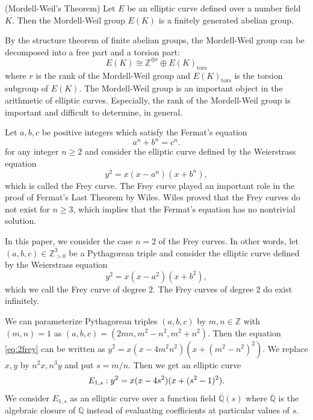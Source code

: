\documentclass[main]{subfiles}
\begin{document}
\begin{thm}{(Mordell-Weil's Theorem)}
    \label{thm:mordell}
    Let $E$ be an elliptic curve defined over a number field $K$.
    Then the Mordell-Weil group $E(K)$ is a finitely generated abelian group.
\end{thm}
By the structure theorem of finite abelian groups, the Mordell-Weil group can be decomposed into a free part and a torsion part:
\begin{equation*}
    E(K) \cong \mathbb{Z}^{\oplus r} \oplus E(K)_{\text{tors}}
\end{equation*}
where $r$ is the rank of the Mordell-Weil group and $E(K)_{\text{tors}}$ is the torsion subgroup of $E(K)$.
The Mordell-Weil group is an important object in the arithmetic of elliptic curves.
Especially, the rank of the Mordell-Weil group is important and difficult to determine, in general.

Let $a,b,c$ be positive integers which satisfy the Fermat's equation
\begin{equation*}
    a^{n} + b^{n} = c^{n}.
\end{equation*}
for any integer $n \geq 2$ and consider the elliptic curve defined by the Weierstrass equation
\begin{equation*}
    y^{2} = x(x - a^{n})(x + b^{n}),
\end{equation*}
which is called the Frey curve.
The Frey curve played an important role in the proof of Fermat's Last Theorem by Wiles.
Wiles proved that the Frey curves do not exist for $n \geq 3$, which implies that the Fermat's equation has no nontrivial solution.

In this paper, we consider the case $n=2$ of the Frey curves.
In other words, let $(a,b,c) \in \mathbb{Z}_{> 0}^3$ be a Pythagorean triple and consider the elliptic curve defined by the Weierstrass equation
\begin{equation}
    \label{eq:2frey}
    y^{2} = x(x - a^{2})(x + b^{2}),
\end{equation}
which we call the Frey curve of degree $2$.
The Frey curves of degree $2$ do exist infinitely.

We can parameterize Pythagorean triples $(a,b,c)$ by $m,n \in \mathbb{Z}$ with $(m,n)=1$ as $(a,b,c) = (2mn, m^{2} - n^{2}, m^{2} + n^{2})$.
Then the equation \eqref{eq:2frey} can be written as $y^{2} = x(x - 4m^2n^2)(x + (m^{2} - n^2)^{2})$.
We replace $x,y$ by $n^2x, n^3y$ and put $s = m/n$.
Then we get an elliptic curve
\begin{equation}
    \label{eq:E_{1,s}}
    E_{1,s}: y^{2} = x(x - 4s^{2})(x + (s^{2} - 1)^{2}).
\end{equation}
We consider $E_{1,s}$ as an elliptic curve over a function field $\overline{\mathbb{Q}}(s)$ where $\overline{\mathbb{Q}}$ is the algebraic closure of $\mathbb{Q}$ instead of evaluating coefficients at particular values of $s$.
\end{document}
